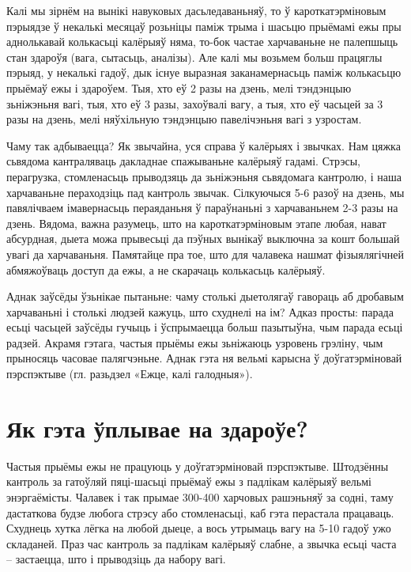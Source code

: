 Калі мы зірнём на вынікі навуковых дасьледаваньняў, то ў кароткатэрміновым пэрыядзе ў некалькі месяцаў розьніцы паміж трыма і шасьцю прыёмамі ежы пры аднолькавай колькасьці калёрыяў няма, то-бок частае харчаваньне не палепшыць стан здароўя (вага, сытасьць, аналізы). Але калі мы возьмем больш працяглы пэрыяд, у некалькі гадоў, дык існуе выразная заканамернасьць паміж колькасьцю прыёмаў ежы і здароўем. Тыя, хто еў 2 разы на дзень, мелі тэндэнцыю зьніжэньня вагі, тыя, хто еў 3 разы, захоўвалі вагу, а тыя, хто еў часьцей за 3 разы на дзень, мелі няўхільную тэндэнцыю павелічэньня вагі з узростам.

Чаму так адбываецца? Як звычайна, уся справа ў калёрыях і звычках. Нам цяжка сьвядома кантраляваць дакладнае спажываньне калёрыяў гадамі. Стрэсы, перагрузка, стомленасьць прыводзяць да зьніжэньня сьвядомага кантролю, і наша харчаваньне пераходзіць пад кантроль звычак. Сілкуючыся 5-6 разоў на дзень, мы павялічваем імавернасьць пераяданьня ў параўнаньні з харчаваньнем 2-3 разы на дзень. Вядома, важна разумець, што на кароткатэрміновым этапе любая, нават абсурдная, дыета можа прывесьці да пэўных вынікаў выключна за кошт большай увагі да харчаваньня. Памятайце пра тое, што для чалавека нашмат фізыялягічней абмяжоўваць доступ да ежы, а не скарачаць колькасьць калёрыяў.

Аднак заўсёды ўзьнікае пытаньне: чаму столькі дыетолягаў гавораць аб дробавым харчаваньні і столькі людзей кажуць, што схуднелі на ім? Адказ просты: парада есьці часьцей заўсёды гучыць і ўспрымаецца больш пазытыўна, чым парада есьці радзей. Акрамя гэтага, частыя прыёмы ежы зьніжаюць узровень грэліну, чым прыносяць часовае палягчэньне. Аднак гэта ня вельмі карысна ў доўгатэрміновай пэрспэктыве (гл. разьдзел «Ежце, калі галодныя»).

\section{Як гэта ўплывае на здароўе?}

Частыя прыёмы ежы не працуюць у доўгатэрміновай пэрспэктыве. Штодзённы кантроль за гатоўляй пяці-шасьці прыёмаў ежы з падлікам калёрыяў вельмі энэргаёмісты. Чалавек і так прымае 300-400 харчовых рашэньняў за содні, таму дастаткова будзе любога стрэсу або стомленасьці, каб гэта перастала працаваць. Схуднець хутка лёгка на любой дыеце, а вось утрымаць вагу на 5-10 гадоў ужо складаней. Праз час кантроль за падлікам калёрыяў слабне, а звычка есьці часта – застаецца, што і прыводзіць да набору вагі.


